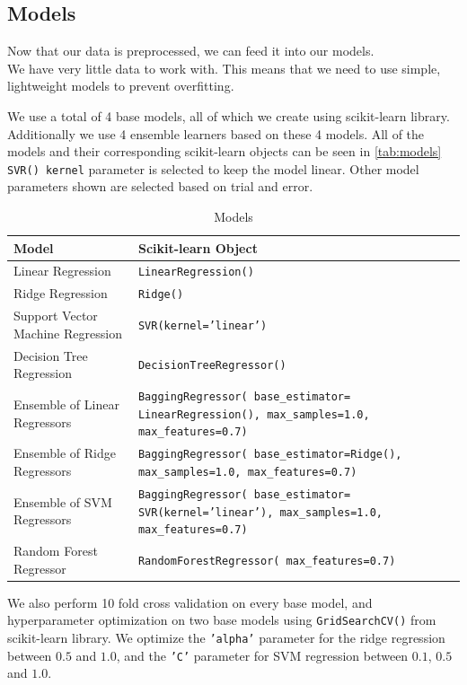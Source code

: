 \subsection{Models}
Now that our data is preprocessed, we can feed it into our models.\\
We have very little data to work with.
This means that we need to use simple, lightweight models to prevent overfitting.

We use a total of 4 base models, all of which we create using scikit-learn library.
Additionally we use 4 ensemble learners based on these 4 models.
All of the models and their corresponding scikit-learn objects can be seen in \autoref{tab:models}
\texttt{SVR() kernel} parameter is selected to keep the model linear.
Other model parameters shown are selected based on trial and error.

\begin{table}[htbp]
  \caption[Models]{Models}\label{tab:models}
  \centering
  \begin{tabular}{l|p{6cm}}
    Model&Scikit-learn Object\\ \toprule
    Linear Regression&\texttt{LinearRegression()}\\ \hline
    Ridge Regression&\texttt{Ridge()}\\ \hline
    Support Vector Machine Regression&\texttt{SVR(kernel='linear')}\\ \hline
    Decision Tree Regression&\texttt{DecisionTreeRegressor()}\\ \hline
    Ensemble of Linear Regressors&\texttt{BaggingRegressor( base\_estimator= LinearRegression(), max\_samples=1.0, max\_features=0.7)}\\ \hline
    Ensemble of Ridge Regressors &\texttt{BaggingRegressor( base\_estimator=Ridge(), max\_samples=1.0, max\_features=0.7)}\\ \hline
    Ensemble of SVM Regressors &\texttt{BaggingRegressor( base\_estimator= SVR(kernel='linear'), max\_samples=1.0, max\_features=0.7)}\\ \hline
    Random Forest Regressor&\texttt{RandomForestRegressor( max\_features=0.7)}\\ \hline
  \end{tabular}
\end{table}

We also perform 10 fold cross validation on every base model, and hyperparameter optimization on two base models using \texttt{GridSearchCV()} from scikit-learn library.
We optimize the \texttt{'alpha'} parameter for the ridge regression between $0.5$ and $1.0$, 
and the \texttt{'C'} parameter for SVM regression between $0.1$, $0.5$ and $1.0$.


